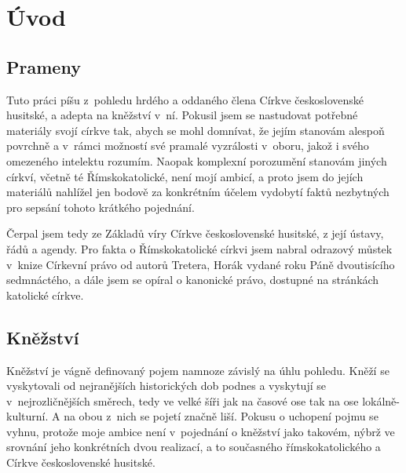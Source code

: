 \chapter{Úvod}
\label{kap:uvod}

\section{Prameny}

Tuto práci píšu z~pohledu hrdého a oddaného člena Církve československé
husitské, a adepta na kněžství v~ní. Pokusil jsem se nastudovat potřebné
materiály svojí církve tak, abych se mohl domnívat, že jejím stanovám
alespoň povrchně a v~rámci možností své pramalé vyzrálosti v~oboru, jakož i
svého omezeného intelektu rozumím. Naopak komplexní porozumění stanovám jiných
církví, včetně té Římskokatolické, není mojí ambicí, a proto jsem do jejích
materiálů nahlížel jen bodově za konkrétním účelem vydobytí faktů nezbytných pro
sepsání tohoto krátkého pojednání.

Čerpal jsem tedy ze Základů víry Církve československé husitské, z její ústavy,
řádů a agendy. Pro fakta o Římskokatolické církvi jsem nabral odrazový můstek
v~knize Církevní právo od autorů Tretera, Horák vydané roku Páně dvoutisícího
sedmnáctého, a dále jsem se opíral o kanonické právo, dostupné na stránkách
katolické církve.

\section{Kněžství}

Kněžství je vágně definovaný pojem namnoze závislý na úhlu pohledu. Kněží se
vyskytovali od nejranějších historických dob podnes a vyskytují se
v~nejrozličnějších směrech, tedy ve velké šíři jak na časové ose tak na ose
lokálně-kulturní. A na obou z~nich se pojetí značně liší. Pokusu o uchopení
pojmu se vyhnu, protože moje ambice není v~pojednání o kněžství jako takovém,
nýbrž ve srovnání jeho konkrétních dvou realizací, a to současného
římskokatolického a Církve československé husitské.

